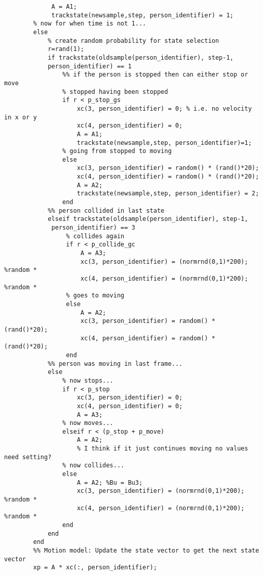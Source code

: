 \documentclass{article}
\begin{document}
\begin{lstlisting}
             A = A1;
             trackstate(newsample,step, person_identifier) = 1;
        % now for when time is not 1...
        else
            % create random probability for state selection
            r=rand(1); 
            if trackstate(oldsample(person_identifier), step-1, 
            person_identifier) == 1
                %% if the person is stopped then can either stop or move
                % stopped having been stopped
                if r < p_stop_gs   
                    xc(3, person_identifier) = 0; % i.e. no velocity in x or y
                    xc(4, person_identifier) = 0;
                    A = A1;   
                    trackstate(newsample,step, person_identifier)=1;
                % going from stopped to moving
                else 
                    xc(3, person_identifier) = random() * (rand()*20); 
                    xc(4, person_identifier) = random() * (rand()*20); 
                    A = A2; 
                    trackstate(newsample,step, person_identifier) = 2;
                end
            %% person collided in last state
            elseif trackstate(oldsample(person_identifier), step-1,
             person_identifier) == 3
                 % collides again
                 if r < p_collide_gc
                     A = A3; 
                     xc(3, person_identifier) = (normrnd(0,1)*200); %random *
                     xc(4, person_identifier) = (normrnd(0,1)*200); %random *
                 % goes to moving
                 else
                     A = A2; 
                     xc(3, person_identifier) = random() * (rand()*20);
                     xc(4, person_identifier) = random() * (rand()*20);
                 end 
            %% person was moving in last frame...     
            else
                % now stops...
                if r < p_stop
                    xc(3, person_identifier) = 0;
                    xc(4, person_identifier) = 0;
                    A = A3;
                % now moves...
                elseif r < (p_stop + p_move)
                    A = A2; 
                    % I think if it just continues moving no values need setting?
                % now collides...
                else
                    A = A2; %Bu = Bu3;
                    xc(3, person_identifier) = (normrnd(0,1)*200); %random *
                    xc(4, person_identifier) = (normrnd(0,1)*200); %random *
                end
            end
        end
        %% Motion model: Update the state vector to get the next state vector
        xp = A * xc(:, person_identifier);      


\end{lstlisting}
\end{document}
